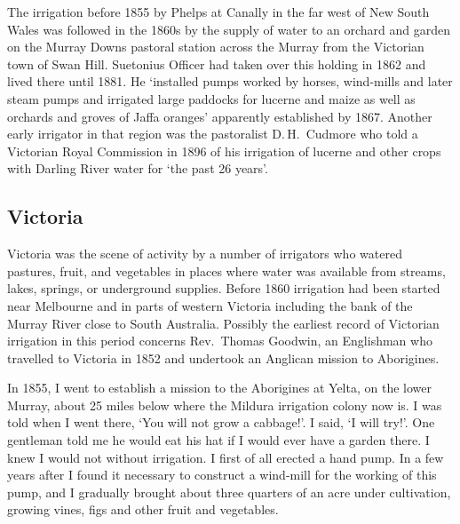 The irrigation before 1855 by Phelps at Canally 
in the far west of New South Wales was followed in the 1860s by the
supply of water to an orchard  and
garden on the Murray Downs 
pastoral station across the Murray from the Victorian town of Swan
Hill.  Suetonius Officer 
had taken over this holding in 1862 and lived there until 1881.  He
`installed pumps worked by horses,
wind-mills and later steam pumps
 and irrigated large paddocks for
lucerne  and maize  as well as orchards and
groves of Jaffa oranges' apparently established by 1867.
Another early irrigator in that region was the pastoralist
D.\,H.~Cudmore  who told a Victorian Royal
Commission in 1896 of his irrigation of lucerne and other crops with
Darling River  water for `the past 26
years'.

\subsection*{Victoria}

Victoria was the scene of activity by a number of irrigators who
watered pastures,  fruit,  and vegetables
 in places where water was available from str\-eams,
lakes, springs, or underground supplies.  Before 1860 irrigation had
been started near Melbourne  and in parts of
western Victoria including the bank of the Murray River
 close to South Australia.  Possibly the earliest
record of Victorian irrigation in this period concerns Rev.\ Thomas
Goodwin,  an Englishman who travelled to Victoria
in 1852 and undertook an Anglican mission to
Aborigines.
\begin{Quote}
	In 1855, I went to establish a mission to the Aborigines at
	Yelta, on the lower Murray, about 25 miles below where the
	Mildura  irrigation colony now is.  I was
	told when I went there, `You will not grow a cabbage!'.  I
	said, `I will try!'.  One gentleman told me he would eat his
	hat if I would ever have a garden there.  I knew I would not
	without irrigation.  I first of all erected a hand pump.
	 In a few years after
	I found it necessary to construct a wind-mill
	 for the working of this
	pump, and I gradually brought about three quarters of an acre
	under cultivation, growing vines, figs and other fruit and
	vegetables.
\end{Quote}

